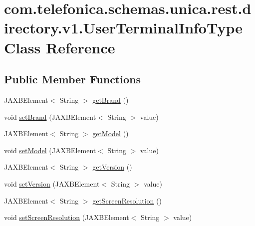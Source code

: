 \hypertarget{classcom_1_1telefonica_1_1schemas_1_1unica_1_1rest_1_1directory_1_1v1_1_1UserTerminalInfoType}{
\section{com.telefonica.schemas.unica.rest.directory.v1.UserTerminalInfoType Class Reference}
\label{classcom_1_1telefonica_1_1schemas_1_1unica_1_1rest_1_1directory_1_1v1_1_1UserTerminalInfoType}
}
\subsection*{Public Member Functions}
\begin{DoxyCompactItemize}
\item 
JAXBElement$<$ String $>$ \hyperlink{classcom_1_1telefonica_1_1schemas_1_1unica_1_1rest_1_1directory_1_1v1_1_1UserTerminalInfoType_a772c3699bacd8ee1c7dd6225ee89ebdf}{getBrand} ()
\item 
void \hyperlink{classcom_1_1telefonica_1_1schemas_1_1unica_1_1rest_1_1directory_1_1v1_1_1UserTerminalInfoType_a8571021cc6fa2b0af8497c8b06f15094}{setBrand} (JAXBElement$<$ String $>$ value)
\item 
JAXBElement$<$ String $>$ \hyperlink{classcom_1_1telefonica_1_1schemas_1_1unica_1_1rest_1_1directory_1_1v1_1_1UserTerminalInfoType_aecf8000fd68c28a7643e52f4fe046c8d}{getModel} ()
\item 
void \hyperlink{classcom_1_1telefonica_1_1schemas_1_1unica_1_1rest_1_1directory_1_1v1_1_1UserTerminalInfoType_abbbb857d989af8a6cedfc490ecd45ad9}{setModel} (JAXBElement$<$ String $>$ value)
\item 
JAXBElement$<$ String $>$ \hyperlink{classcom_1_1telefonica_1_1schemas_1_1unica_1_1rest_1_1directory_1_1v1_1_1UserTerminalInfoType_a0853ff2f86be38bd239d9fa42c19b70a}{getVersion} ()
\item 
void \hyperlink{classcom_1_1telefonica_1_1schemas_1_1unica_1_1rest_1_1directory_1_1v1_1_1UserTerminalInfoType_ad22ccc5418543baa7267705b993c7139}{setVersion} (JAXBElement$<$ String $>$ value)
\item 
JAXBElement$<$ String $>$ \hyperlink{classcom_1_1telefonica_1_1schemas_1_1unica_1_1rest_1_1directory_1_1v1_1_1UserTerminalInfoType_af53905fdc9eecd80a7e368ebff3e8739}{getScreenResolution} ()
\item 
void \hyperlink{classcom_1_1telefonica_1_1schemas_1_1unica_1_1rest_1_1directory_1_1v1_1_1UserTerminalInfoType_a8e622d4aeed5723a86098e3bed8efb03}{setScreenResolution} (JAXBElement$<$ String $>$ value)

\end{DoxyCompactItemize}
